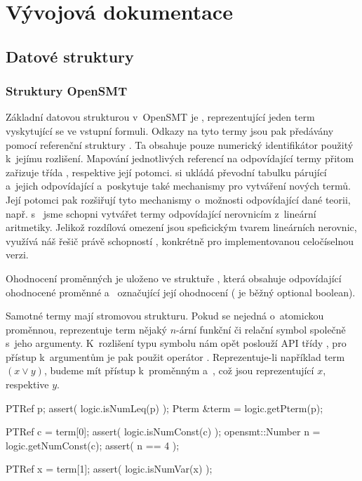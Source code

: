 \chapter{Vývojová dokumentace}

\section{Datové struktury}\label{data}

\subsection*{Struktury OpenSMT}
Základní datovou strukturou v~OpenSMT je , reprezentující jeden term vyskytující se ve vstupní formuli. Odkazy na tyto termy jsou pak předávány pomocí referenční struktury . Ta obsahuje pouze numerický identifikátor použitý k~jejímu rozlišení. Mapování jednotlivých referencí na odpovídající termy přitom zařizuje třída , respektive její potomci.  si ukládá převodní tabulku párující  a~jejich odpovídající  a~poskytuje také mechanismy pro vytváření nových termů. Její potomci pak rozšiřují tyto mechanismy o~možnosti odpovídající dané teorii, např. s~ jsme schopni vytvářet termy odpovídající nerovnicím z~lineární aritmetiky. Jelikož rozdílová omezení jsou speficickým tvarem lineárních nerovnic, využívá náš řešič právě schopností , konkrétně  pro implementovanou celočíselnou verzi.

Ohodnocení proměnných je uloženo ve struktuře , která obsahuje  odpovídající ohodnocené proměnné a~ označující její ohodnocení ( je běžný optional boolean).

Samotné termy mají stromovou strukturu. Pokud se nejedná o~atomickou proměnnou, reprezentuje term nějaký $n$-ární funkční či relační symbol společně s~jeho argumenty. K~rozlišení typu symbolu nám opět poslouží API třídy , pro přístup k~argumentům je pak použit operátor \icode{[]}. Reprezentuje-li například  term $(x \lor y)$, budeme mít přístup k~proměnným  a~, což jsou  reprezentující $x$, respektive $y$. 

\begin{code}[label=Příklad práce s~termem p $\approx (4 \leq x)$]
PTRef p;    
assert( logic.isNumLeq(p) );
Pterm &term = logic.getPterm(p);

PTRef c = term[0];
assert( logic.isNumConst(c) );
opensmt::Number n = logic.getNumConst(c);
assert( n == 4 );

PTRef x = term[1];
assert( logic.isNumVar(x) );
\end{code}

